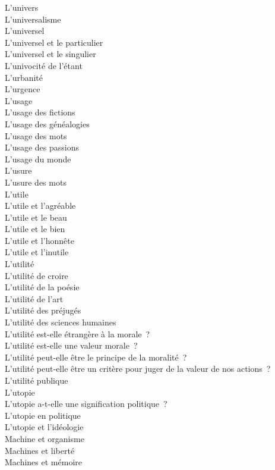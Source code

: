 \documentclass[a4paper,12pt]{article}
\begin{document}
L'univers \\
L'universalisme \\
L'universel \\
L'universel et le particulier \\
L'universel et le singulier \\
L'univocité de l'étant \\
L'urbanité \\
L'urgence \\
L'usage \\
L'usage des fictions \\
L'usage des généalogies \\
L'usage des mots \\
L'usage des passions \\
L'usage du monde \\
L'usure \\
L'usure des mots \\
L'utile \\
L'utile et l'agréable \\
L'utile et le beau \\
L'utile et le bien \\
L'utile et l'honnête \\
L'utile et l'inutile \\
L'utilité \\
L'utilité de croire \\
L'utilité de la poésie \\
L'utilité de l'art \\
L'utilité des préjugés \\
L'utilité des sciences humaines \\
L'utilité est-elle étrangère à la morale ? \\
L'utilité est-elle une valeur morale ? \\
L'utilité peut-elle être le principe de la moralité ? \\
L'utilité peut-elle être un critère pour juger de la valeur de nos actions ? \\
L'utilité publique \\
L'utopie \\
L'utopie a-t-elle une signification politique ? \\
L'utopie en politique \\
L'utopie et l'idéologie \\
Machine et organisme \\
Machines et liberté \\
Machines et mémoire \\
\end{document}
